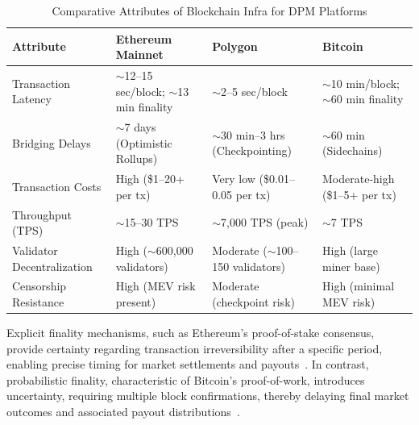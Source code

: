 {\begin{table}[htbp]
    \centering
    \caption{Comparative Attributes of Blockchain Infra for DPM Platforms}
    \begin{tabular}{
        |p{3.2cm}|
        >{\centering\arraybackslash}p{3.2cm}|
        >{\centering\arraybackslash}p{3.2cm}|
        >{\centering\arraybackslash}p{3.2cm}|
     }
         \hline \textbf{Attribute} & \textbf{Ethereum Mainnet} & \textbf{Polygon} & \textbf{Bitcoin} \\
         \hline Transaction Latency & $\sim$12--15 sec/block; \newline $\sim$13 min finality & $\sim$2--5 sec/block & $\sim$10 min/block; \newline $\sim$60 min finality \\
         \hline Bridging Delays & $\sim$7 days \newline (Optimistic Rollups) & $\sim$30 min--3 hrs \newline (Checkpointing) & $\sim$60 min \newline (Sidechains) \\
         \hline Transaction Costs & High \newline (\$1--20+ per tx) & Very low \newline (\$0.01--0.05 per tx) & Moderate-high \newline (\$1--5+ per tx) \\
         \hline Throughput (TPS) & $\sim$15--30 TPS & $\sim$7,000 TPS (peak) & $\sim$7 TPS \\
         \hline Validator Decentralization & High \newline ($\sim$600,000 validators) & Moderate \newline ($\sim$100--150 validators) & High \newline (large miner base) \\
         \hline Censorship Resistance & High \newline (MEV risk present) & Moderate \newline (checkpoint risk) & High \newline (minimal MEV risk) \\
         \hline
    \end{tabular}
    \label{tab:blockchain_infra}
\end{table}

Explicit finality mechanisms, such as Ethereum’s proof-of-stake consensus, provide certainty regarding transaction irreversibility after a specific period, enabling precise timing for market settlements and payouts~\cite{ClEsGS21}. In contrast, probabilistic finality, characteristic of Bitcoin’s proof-of-work, introduces uncertainty, requiring multiple block confirmations, thereby delaying final market outcomes and associated payout distributions~\cite{BCFKMN14}.

}
